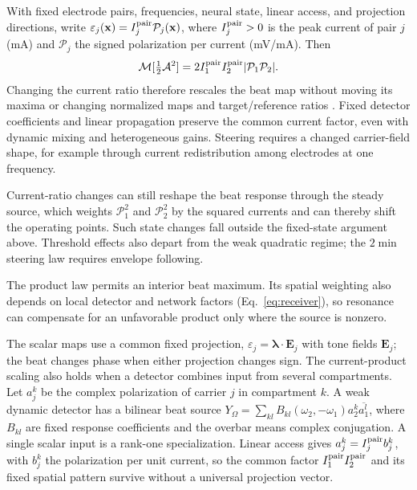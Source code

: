 \documentclass[a4paper]{article}
\begin{document}
With fixed electrode pairs, frequencies, neural state, linear access, and
projection directions, write
$\varepsilon_j(\mathbf x)=I_j^{\rm pair}\mathcal P_j(\mathbf x)$,
where $I_j^{\rm pair}>0$ is the peak current of pair $j$ (mA) and $\mathcal P_j$
the signed polarization per current (mV/mA). Then
\[
\mathcal M[\tfrac12\mathcal A^2]
=2I_1^{\rm pair}I_2^{\rm pair}|\mathcal P_1\mathcal P_2|.
\]
Changing the current ratio therefore rescales the beat map without moving its maxima
or changing normalized maps and target/reference ratios
\cite{cassara2025part2}. Fixed detector coefficients and linear propagation
preserve the common current factor, even with dynamic mixing and heterogeneous
gains. Steering requires a changed carrier-field shape, for example through
current redistribution among electrodes at one frequency.

Current-ratio changes can still reshape the beat response through the steady source,
which weights $\mathcal P_1^2$ and $\mathcal P_2^2$ by the squared currents and can
thereby shift the operating points. Such state changes fall outside the fixed-state
argument above. Threshold effects also depart from the weak quadratic regime; the
$2\min$ steering law requires envelope following.

The product law permits an interior beat maximum. Its spatial weighting also
depends on local detector and network factors (Eq.~\eqref{eq:receiver}), so
resonance can compensate for an unfavorable product only where the source
is nonzero.

The scalar maps use a common fixed projection,
$\varepsilon_j=\boldsymbol\lambda\cdot\mathbf E_j$ with tone fields $\mathbf E_j$; the beat changes phase
when either projection changes sign. The current-product scaling also holds
when a detector combines input from several compartments. Let $a_j^k$ be the
complex polarization of carrier $j$ in compartment $k$. A weak dynamic
detector has a bilinear beat source
$Y_\Omega=\sum_{kl}B_{kl}(\omega_2,-\omega_1)a_2^k\overline{a_1^l}$,
where $B_{kl}$ are fixed response coefficients and the overbar means complex
conjugation. A single scalar input is a rank-one specialization. Linear
access gives $a_j^k=I_j^{\rm pair}b_j^k$, with $b_j^k$ the polarization per
unit current, so the common factor $I_1^{\rm pair}I_2^{\rm pair}$ and its
fixed spatial pattern survive without a universal projection vector.
\end{document}
